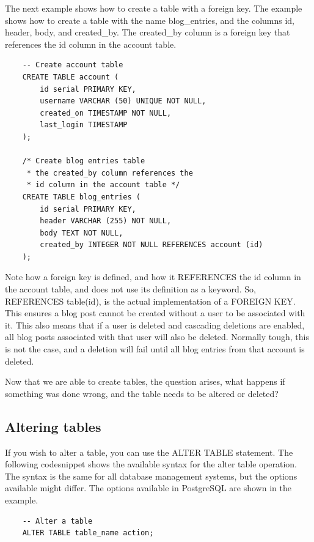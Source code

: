 The next example shows how to create a table with a foreign key. The example shows how to create a table with the name blog\_entries, and the columns id, header, body, and created\_by. The created\_by column is a foreign key that references the id column in the account table. 

\begin{verbatim}
    -- Create account table
    CREATE TABLE account (
        id serial PRIMARY KEY,
        username VARCHAR (50) UNIQUE NOT NULL,
        created_on TIMESTAMP NOT NULL, 
        last_login TIMESTAMP
    );
    
    /* Create blog entries table
     * the created_by column references the 
     * id column in the account table */
    CREATE TABLE blog_entries (
        id serial PRIMARY KEY, 
        header VARCHAR (255) NOT NULL,
        body TEXT NOT NULL,
        created_by INTEGER NOT NULL REFERENCES account (id)
    );
\end{verbatim}

Note how a foreign key is defined, and how it REFERENCES the id column in the account table, and does not use its definition as a keyword. So, REFERENCES table(id), is the actual implementation of a FOREIGN KEY. This ensures a blog post cannot be created without a user to be associated with it. This also means that if a user is deleted and cascading deletions are enabled, all blog posts associated with that user will also be deleted. Normally tough, this is not the case, and a deletion will fail until all blog entries from that account is deleted.

Now that we are able to create tables, the question arises, what happens if something was done wrong, and the table needs to be altered or deleted? 

\subsection{Altering tables}
If you wish to alter a table, you can use the ALTER TABLE statement. The following codesnippet shows the available syntax for the alter table operation. The syntax is the same for all database management systems, but the options available might differ. The options available in PostgreSQL are shown in the example.

\begin{verbatim}
    -- Alter a table
    ALTER TABLE table_name action;
\end{verbatim}

